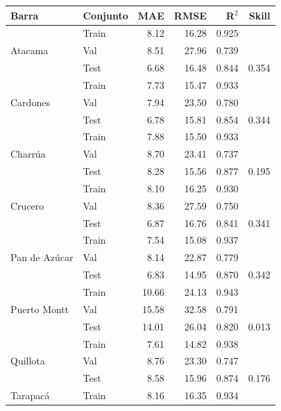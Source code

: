 \begin{table}[htbp]
    \centering
    \small
    \begin{tabular}{llrrrr}
        \toprule
        Barra & Conjunto & MAE & RMSE & R$^2$ & Skill \\
        \midrule
        \multirow{3}{*}{Atacama}
            & Train & 8.12 & 16.28 & 0.925 & \\
            & Val   & 8.51 & 27.96 & 0.739 & \\
            & Test  & 6.68 & 16.48 & 0.844 & 0.354 \\
        \midrule
        \multirow{3}{*}{Cardones}
            & Train & 7.73 & 15.47 & 0.933 & \\
            & Val   & 7.94 & 23.50 & 0.780 & \\
            & Test  & 6.78 & 15.81 & 0.854 & 0.344 \\
        \midrule
        \multirow{3}{*}{Charrúa}
            & Train & 7.88 & 15.50 & 0.933 & \\
            & Val   & 8.70 & 23.41 & 0.737 & \\
            & Test  & 8.28 & 15.56 & 0.877 & 0.195 \\
        \midrule
        \multirow{3}{*}{Crucero}
            & Train & 8.10 & 16.25 & 0.930 & \\
            & Val   & 8.36 & 27.59 & 0.750 & \\
            & Test  & 6.87 & 16.76 & 0.841 & 0.341 \\
        \midrule
        \multirow{3}{*}{Pan de Azúcar}
            & Train & 7.54 & 15.08 & 0.937 & \\
            & Val   & 8.14 & 22.87 & 0.779 & \\
            & Test  & 6.83 & 14.95 & 0.870 & 0.342 \\
        \midrule
        \multirow{3}{*}{Puerto Montt}
            & Train & 10.66 & 24.13 & 0.943 & \\
            & Val   & 15.58 & 32.58 & 0.791 & \\
            & Test  & 14.01 & 26.04 & 0.820 & 0.013 \\
        \midrule
        \multirow{3}{*}{Quillota}
            & Train & 7.61 & 14.82 & 0.938 & \\
            & Val   & 8.76 & 23.30 & 0.747 & \\
            & Test  & 8.58 & 15.96 & 0.874 & 0.176 \\
        \midrule
        \multirow{3}{*}{Tarapacá}
            & Train & 8.16 & 16.35 & 0.934 & \\

\end{tabular}
\end{table}
